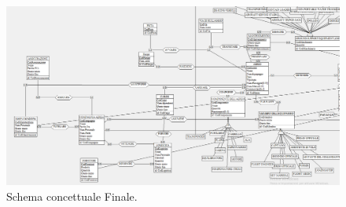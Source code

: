 \begin{figure}[H] 
	\centering
	\includegraphics[width=1.2\linewidth, height=1.2\textheight, keepaspectratio]{./img/Schema_Concettuale/Schema_Finale4.png}
	\caption{Schema concettuale Finale.}
	\label{fig:schema_finale4}
\end{figure}

\restoregeometry

